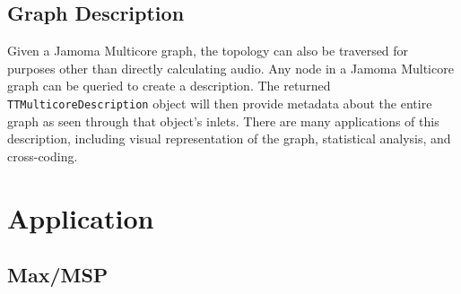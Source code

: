 \documentclass[twoside,a4paper]{article}
\begin{document}


\subsection{Graph Description} %

Given a Jamoma Multicore graph, the topology can also be traversed for purposes other than directly calculating audio.  
Any node in a Jamoma Multicore graph can be queried to create a description.  The returned \texttt{TTMulticoreDescription} object will then provide metadata about the entire graph as seen through that object's inlets.  
There are many applications of this description, including visual representation of the graph, statistical analysis, and cross-coding.






%
\section{Application} %
%

\subsection{Max/MSP} %
\end{document}

